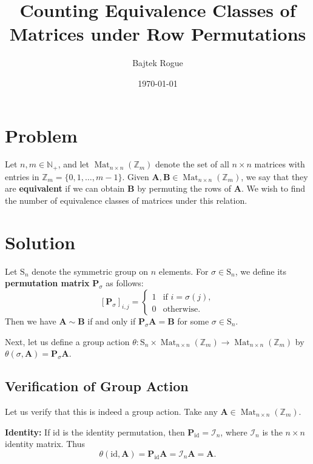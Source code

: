 \documentclass[a4paper,12pt]{report}
\title{Counting Equivalence Classes of Matrices under Row Permutations}
\author{Bajtek Rogue}
\date{\today}
\DeclareMathOperator{\Mat}{Mat}
\begin{document}
\maketitle

\section*{Problem}

Let $n,m\in\mathbb{N}_+$, and let $\Mat_{n\times n}(\mathbb{Z}_m)$ denote the set of all $n \times n$ matrices with entries in $\mathbb{Z}_m=\{0,1,\dots, m-1\}$. Given $\mathbf{A},\mathbf{B}\in \Mat_{n\times n}(\mathbb{Z}_m)$, we say that they are \textbf{equivalent} if we can obtain $\mathbf{B}$ by permuting the rows of $\mathbf{A}$. We wish to find the number of equivalence classes of matrices under this relation.

\section*{Solution}

Let $\mathrm{S}_n$ denote the symmetric group on $n$ elements. For $\sigma\in \mathrm{S}_n$, we define its \textbf{permutation matrix} $\mathbf{P}_\sigma$ as follows:
\[
    [\mathbf{P}_\sigma]_{i,j} =
    \begin{cases}
    1 & \text{if } i = \sigma(j), \\
    0 & \text{otherwise}.
    \end{cases}
\]
Then we have $\mathbf{A}\sim\mathbf{B}$ if and only if $\mathbf{P}_\sigma\mathbf{A}=\mathbf{B}$ for some $\sigma \in \mathrm{S}_n$. 

Next, let us define a group action $\theta:\mathrm{S}_n\times \Mat_{n\times n}(\mathbb{Z}_m)\to \Mat_{n\times n}(\mathbb{Z}_m)$ by $\theta(\sigma, \mathbf{A})=\mathbf{P}_\sigma\mathbf{A}$. 

\subsection*{Verification of Group Action}

Let us verify that this is indeed a group action. Take any $\mathbf{A}\in \Mat_{n\times n}(\mathbb{Z}_m)$.

\medskip
\noindent\textbf{Identity:} If $\mathrm{id}$ is the identity permutation, then $\mathbf{P}_{\mathrm{id}}=\mathcal{I}_n$, where $\mathcal{I}_n$ is the $n\times n$ identity matrix. Thus 
\[
\theta(\mathrm{id}, \mathbf{A})=\mathbf{P}_{\mathrm{id}}\mathbf{A}=\mathcal{I}_n\mathbf{A}=\mathbf{A}.
\]
\end{document}
